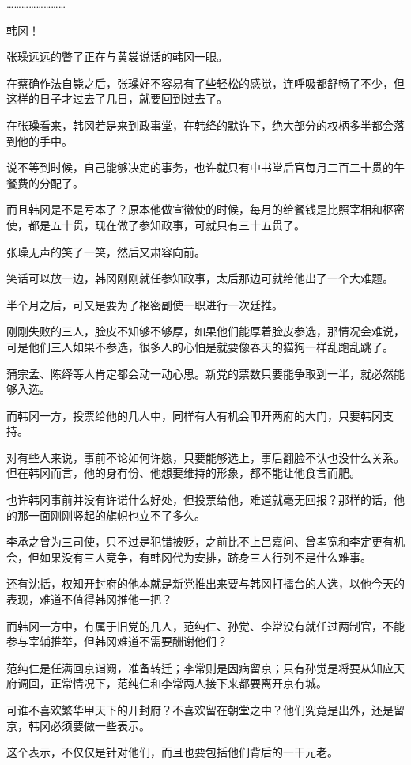 ……………………

韩冈！

张璪远远的瞥了正在与黄裳说话的韩冈一眼。

在蔡确作法自毙之后，张璪好不容易有了些轻松的感觉，连呼吸都舒畅了不少，但这样的日子才过去了几日，就要回到过去了。

在张璪看来，韩冈若是来到政事堂，在韩绛的默许下，绝大部分的权柄多半都会落到他的手中。

说不等到时候，自己能够决定的事务，也许就只有中书堂后官每月二百二十贯的午餐费的分配了。

而且韩冈是不是亏本了？原本他做宣徽使的时候，每月的给餐钱是比照宰相和枢密使，都是五十贯，现在做了参知政事，可就只有三十五贯了。

张璪无声的笑了一笑，然后又肃容向前。

笑话可以放一边，韩冈刚刚就任参知政事，太后那边可就给他出了一个大难题。

半个月之后，可又是要为了枢密副使一职进行一次廷推。

刚刚失败的三人，脸皮不知够不够厚，如果他们能厚着脸皮参选，那情况会难说，可是他们三人如果不参选，很多人的心怕是就要像春天的猫狗一样乱跑乱跳了。

蒲宗孟、陈绎等人肯定都会动一动心思。新党的票数只要能争取到一半，就必然能够入选。

而韩冈一方，投票给他的几人中，同样有人有机会叩开两府的大门，只要韩冈支持。

对有些人来说，事前不论如何许愿，只要能够选上，事后翻脸不认也没什么关系。但在韩冈而言，他的身冇份、他想要维持的形象，都不能让他食言而肥。

也许韩冈事前并没有许诺什么好处，但投票给他，难道就毫无回报？那样的话，他的那一面刚刚竖起的旗帜也立不了多久。

李承之曾为三司使，只不过是犯错被贬，之前比不上吕嘉问、曾孝宽和李定更有机会，但如果没有三人竞争，有韩冈代为安排，跻身三人行列不是什么难事。

还有沈括，权知开封府的他本就是新党推出来要与韩冈打擂台的人选，以他今天的表现，难道不值得韩冈推他一把？

而韩冈一方中，冇属于旧党的几人，范纯仁、孙觉、李常没有就任过两制官，不能参与宰辅推举，但韩冈难道不需要酬谢他们？

范纯仁是任满回京诣阙，准备转迁；李常则是因病留京；只有孙觉是将要从知应天府调回，正常情况下，范纯仁和李常两人接下来都要离开京冇城。

可谁不喜欢繁华甲天下的开封府？不喜欢留在朝堂之中？他们究竟是出外，还是留京，韩冈必须要做一些表示。

这个表示，不仅仅是针对他们，而且也要包括他们背后的一干元老。

